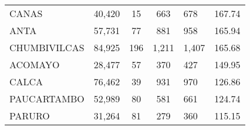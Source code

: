 \begin{tabular}{lrcclr}
	\cellcolor[HTML]{FFFF99}CANAS                                  & 40,420                                                         & 15                                                         & 663                  & 678                                                                 & 167.74                                                                       \\
	\cellcolor[HTML]{FFFF99}ANTA                                   & 57,731                                                         & 77                                                         & 881                  & 958                                                                 & 165.94                                                                       \\
	\cellcolor[HTML]{C6E0B4}CHUMBIVILCAS                           & 84,925                                                         & 196                                                        & 1,211                & 1,407                                                               & 165.68                                                                       \\
	\cellcolor[HTML]{C6E0B4}ACOMAYO                                & 28,477                                                         & 57                                                         & 370                  & 427                                                                 & 149.95                                                                       \\
	\cellcolor[HTML]{C6E0B4}CALCA                                  & 76,462                                                         & 39                                                         & 931                  & 970                                                                 & 126.86                                                                       \\
	\cellcolor[HTML]{C6E0B4}PAUCARTAMBO                            & 52,989                                                         & 80                                                         & 581                  & 661                                                                 & 124.74                                                                       \\
	\cellcolor[HTML]{C6E0B4}PARURO                                 & 31,264                                                         & 81                                                         & 279                  & 360                                                                 & 115.15                                                                       \\

\end{tabular}
